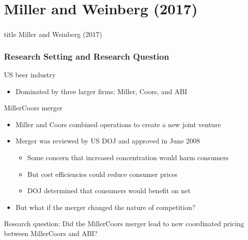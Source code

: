 \documentclass{beamer}
\begin{document}
\section{Miller and Weinberg (2017)}
\label{mw}
\begin{frame}\frametitle{}
    \vfill
    \centering
    \begin{beamercolorbox}[center]{title}
        \Large Miller and Weinberg (2017)
    \end{beamercolorbox}
    \vfill
\end{frame}

\begin{frame}\frametitle{Research Setting and Research Question}
    US beer industry
    \begin{itemize}
        \item Dominated by three larger firms: Miller, Coors, and ABI
    \end{itemize}
    \vspace{2ex}
    MillerCoors merger
    \begin{itemize}
        \item Miller and Coors combined operations to create a new joint venture
        \item Merger was reviewed by US DOJ and approved in June 2008
        \begin{itemize}
            \item Some concern that increased concentration would harm consumers
            \item But cost efficiencies could reduce consumer prices
            \item DOJ determined that consumers would benefit on net
        \end{itemize}
        \item But what if the merger changed the nature of competition?
    \end{itemize}
    \vspace{2ex}
    Research question: Did the MillerCoors merger lead to new coordinated pricing between MillerCoors and ABI?
\end{frame}
\end{document}
